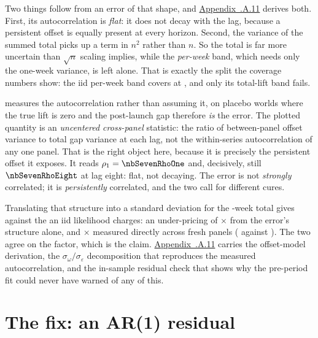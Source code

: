 Two things follow from an error of that shape, and \hyperref[app:sc:acf]{Appendix~\thechapter.A.11}
derives both. First, its autocorrelation is \emph{flat}: it does not decay with the lag, because a
persistent offset is equally present at every horizon. Second, the variance of the summed total
picks up a term in $n^2$ rather than $n$. So the total is far more uncertain than $\sqrt{n}$ scaling
implies, while the \emph{per-week} band, which needs only the one-week variance, is left alone.
That is exactly the split the coverage numbers show: the iid per-week band covers at
\pc{\nbSevenWeekCov}, and only its total-lift band fails.

 measures the autocorrelation rather than assuming it, on placebo worlds where the
true lift is zero and the post-launch gap therefore \emph{is} the error. The plotted quantity is an
\emph{uncentered cross-panel} statistic: the ratio of between-panel offset variance to total gap
variance at each lag, not the within-series autocorrelation of any one panel. That is the
right object here, because it is precisely the persistent offset it exposes. It reads
$\rho_1 = \nbSevenRhoOne$ and, decisively, still $\nbSevenRhoEight$ at lag eight: flat, not
decaying. The error is not \emph{strongly} correlated; it is \emph{persistently} correlated, and
the two call for different cures.



Translating that structure into a standard deviation for the \nbSevenNPost-week total gives
\keur{\nbSevenTotalSdTrue} against the \keur{\nbSevenTotalSdIid} an iid likelihood charges: an
under-pricing of \nbSevenTotalSdRatio$\times$ from the error's structure alone, and
\nbSevenUnderprice$\times$ measured directly across fresh panels (\keur{\nbSevenSeedSd} against
\keur{\nbSevenIidSd}). The two agree on the factor, which is the claim.
\hyperref[app:sc:acf]{Appendix~\thechapter.A.11} carries the offset-model derivation, the
$\sigma_\omega/\sigma_\varepsilon$ decomposition that reproduces the measured autocorrelation, and the
in-sample residual check that shows why the pre-period fit could never have warned of any of this.

\section{The fix: an AR(1) residual}
\label{sec:sc:compare}

